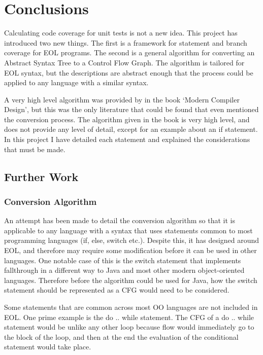 \chapter{Conclusions}
\label{chap:conclusions}

Calculating code coverage for unit tests is not a new idea. This project has introduced two new things. The first is a framework for statement and branch coverage for EOL programs. The second is a general algorithm for converting an Abstract Syntax Tree to a Control Flow Graph. The algorithm is tailored for EOL syntax, but the descriptions are abstract enough that the process could be applied to any language with a similar syntax. 

A very high level algorithm was provided by \citet{grune2000modern} in the book `Modern Compiler Design', but this was the only literature that could be found that even mentioned the conversion process. The algorithm given in the book is very high level, and does not provide any level of detail, except for an example about an if statement. In this project I have detailed each statement and explained the considerations that must be made. 

\section{Further Work}

\subsection{Conversion Algorithm}

An attempt has been made to detail the conversion algorithm so that it is applicable to any language with a syntax that uses statements common to most programming languages (if, else, switch etc.). Despite this, it has designed around EOL, and therefore may require some modification before it can be used in other languages. One notable case of this is the switch statement that implements fallthrough in a different way to Java and most other modern object-oriented languages. Therefore before the algorithm could be used for Java, how the switch statement should be represented as a CFG would need to be considered. 

Some statements that are common across most OO languages are not included in EOL. One prime example is the do .. while statement. The CFG of a do .. while statement would be unlike any other loop because flow would immediately go to the block of the loop, and then at the end the evaluation of the conditional statement would take place.

